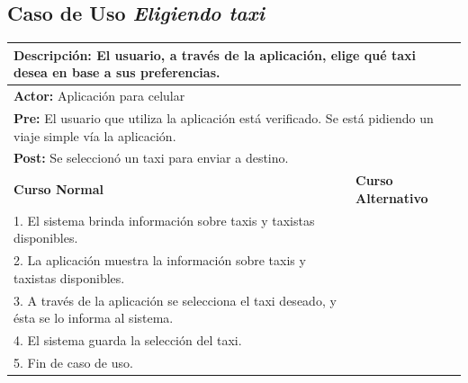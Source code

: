 \documentclass[a4paper]{article}
\begin{document}
\subsection{Caso de Uso \textit{Eligiendo taxi}}
\begin{center}
\begin{tabular}{|p{10cm} | p{6cm}|}
\hline
\multicolumn{2}{|p{16cm}|}{\textbf{Descripci\'on:} El usuario, a trav\'es de la aplicaci\'on, elige qu\'e taxi desea en base a sus preferencias.} \\
\hline
\multicolumn{2}{|p{15cm}|}{\textbf{Actor:} Aplicaci\'on para celular} \\
\hline
\multicolumn{2}{|p{15cm}|}{\textbf{Pre:} El usuario que utiliza la aplicaci\'on est\'a verificado. Se est\'a pidiendo un viaje simple v\'ia la aplicaci\'on.} \\
\hline
\multicolumn{2}{|p{15cm}|}{\textbf{Post:} Se seleccion\'o un taxi para enviar a destino.}\\
\hline
\textbf{Curso Normal}  & \textbf{Curso Alternativo} \\ \hline
1. El sistema brinda informaci\'on sobre taxis y taxistas disponibles.  & \\ \hline
2. La aplicaci\'on muestra la informaci\'on sobre taxis y taxistas disponibles. & \\ \hline
3. A trav\'es de la aplicaci\'on se selecciona el taxi deseado, y \'esta se lo informa al sistema. & \\ \hline
4. El sistema guarda la selecci\'on del taxi. & \\ \hline
5. Fin de caso de uso. & \\ \hline
\end{tabular}
\end{center}
\end{document}
